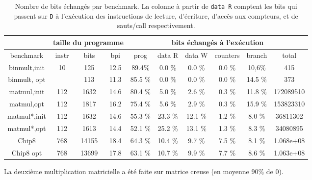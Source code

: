 \documentclass[architecture]{compas2018}
\begin{document}
\iffalse
./asm.py -v -b prog/mult.s
./emu/emu -s -t prog/mult.bin
./emu/emu -i prog/mult.bin | ./huffmann.py > mult.huff
./asm.py --loadhuffman mult.huff -v -b prog/mult.s -o  prog/mult.huff.bin
./emu/emu -s -t -lh mult.huff -i prog/mult.huff.bin

python3 ./matmulstat/makematrix.py
./asm.py -v -b prog/matmul.s
./emu/emu -s -t prog/matmul.bin --load 65536:mat32x32.bytes
./emu/emu -i prog/matmul.bin --load 65536:mat32x32.bytes | ./huffmann.py > matmul.huff
./asm.py --loadhuffman matmul.huff -v -b prog/matmul.s -o prog/matmul.huff.bin
./emu/emu -s -t -lh matmul.huff prog/matmul.huff.bin --load 65536:mat32x32.bytes

idem mais avec python3 ./matmulstat/makematrix.py 0.1 pour une matrice creuse

\fi


\begin{table}
  \centering
  \begin{tabular}{|c||c|c|c||c|c|c|c|c||c|}
    \hline
    & \multicolumn{3}{c||}{taille du programme} & \multicolumn{6}{c|}{bits échangés à l'exécution}                    \\
    \hline

    
    benchmark    & instr & bits & bpi  & prog    & data R & data W & counters & branch  & total \\
    \hline
    \hline
    binmult,init & 10    & 125  & 12.5 & 89.4\%  & 0.0 \% & 0.0 \% & 0.0 \%   & 10,6\%  & 415   \\
    binmult, opt &       & 113  & 11.3 & 85.5 \% & 0.0 \% & 0.0 \% & 0.0 \%   & 14.5 \% & 373   \\
    \hline
    matmul,init & 112 & 1632 & 14.6 &  80.4 \% & 5.0 \% & 2.6 \% & 0.3 \% & 11.8 \% & 172089510\\ 
    matmul,opt & 112 & 1817 & 16.2  &  75.4 \% & 5.6 \% & 2.9 \% & 0.3 \% & 15.9 \% & 153823310\\ 
    \hline
    matmul*,init & 112 & 1632 & 14.6 & 55.3 \% & 23.3 \% & 12.1 \% & 1.2 \% & 8.0 \% & 36811302 \\ 

    matmul*,opt & 112 & 1613 & 14.4  & 52.1 \% & 25.2 \% & 13.1 \% & 1.3 \% & 8.3 \% & 34080895\\ 

    \hline
    Chip8      & 768 & 14155 & 18.4 &  64.3 \% & 10.4 \% & 9.7 \% & 7.5 \% & 8.1 \% & 1.068e+08       \\
    Chip8 opt    & 768 & 13699 & 17.8 & 63.1 \% & 10.7 \% & 9.9 \% & 7.7 \% & 8.6 \% & 1.063e+08\\ 
    \hline
  \end{tabular}
  \caption{Nombre de bits échangés par benchmark. La colonne à partir de \texttt{data R} comptent  les bits qui passent sur \texttt{D} à l'exécution des instructions de lecture, d'écriture, d'accès aux compteurs, et de sauts/call  respectivement. }
  \label{tab:bitcounts}
  La deuxième multiplication matricielle a été faite sur matrice creuse (en moyenne 90\% de 0).
\end{table}
\end{document}
